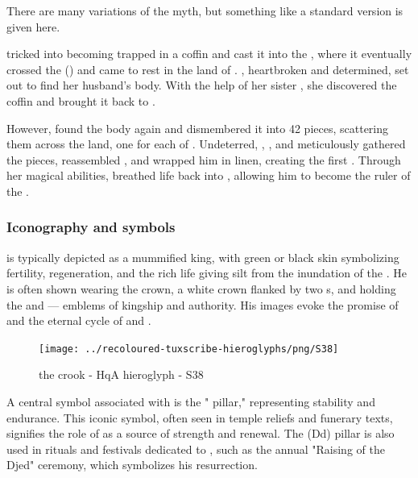 There are many variations of the myth, but something like a standard version is given here.

 tricked  into becoming trapped in a coffin and cast it into the , where it eventually crossed the  () and came to rest in the land of . , heartbroken and determined, set out to find her husband's body. With the help of her sister , she discovered the coffin and brought it back to .

However,  found the body again and dismembered it into 42 pieces, scattering them across the land, one for each  of . Undeterred, , , and  meticulously gathered the pieces, reassembled , and wrapped him in linen, creating the first . Through her magical abilities,  breathed life back into , allowing him to become the ruler of the .

\subsubsection*{Iconography and symbols}

 is typically depicted as a mummified king, with green or black skin symbolizing fertility, regeneration, and the rich life giving silt from the inundation of the . He is often shown wearing the  crown, a white crown flanked by two  s, and holding the  and  — emblems of kingship and authority. His images evoke the promise of  and the eternal cycle of  and .

\begin{figure} [H]
	\centering
	\texttt{[image: ../recoloured-tuxscribe-hieroglyphs/png/S38]}
	\caption{the crook - HqA hieroglyph - S38}
\end{figure}

A central symbol associated with  is the " pillar," representing stability and endurance. This iconic symbol, often seen in temple reliefs and funerary texts, signifies the role of  as a source of strength and renewal. The  (Dd) pillar is also used in rituals and festivals dedicated to , such as the annual "Raising of the Djed" ceremony, which symbolizes his resurrection.

